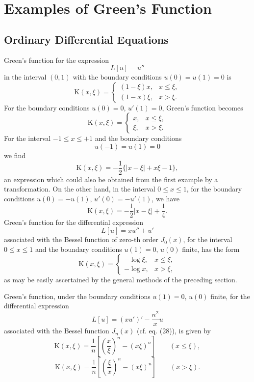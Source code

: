 \section{Examples of Green's Function}
\subsection{Ordinary Differential Equations}
Green's function for the expression
\[
L[u]=u''
\]
in the interval $(0,1)$ with the boundary conditions $u(0)=u(1)=0$ is
\[
\mathrm K(x,\xi)=
\begin{cases}
(1-\xi)x,&x\le\xi,\\
(1-x)\xi,&x>\xi.
\end{cases}
\]
For the boundary conditions $u(0)=0$, $u'(1)=0$, Green's function becomes
\[
\mathrm K(x,\xi)=
\begin{cases}
x,&x\le\xi,\\
\xi,&x>\xi.
\end{cases}
\]
For the interval $-1\le x\le+1$ and the boundary conditions
\[
u(-1)=u(1)=0
\]
we find
\[
\mathrm K(x,\xi)=-\frac12\{|x-\xi|+x\xi-1\},
\]
an expression which could also be obtained from the first example by a transformation. On the other hand, in the interval $0\le x\le1$, for the boundary conditions $u(0)=-u(1)$, $u'(0)=-u'(1)$, we have
\[
\mathrm K(x,\xi)=-\frac12|x-\xi|+\frac14.
\]
Green's function for the differential expression
\[
L[u]=xu''+u'
\]
associated with the Bessel function of zero-th order $J_0(x)$, for the interval $0\le x\le1$ and the boundary conditions $u(1)=0$, $u(0)$ finite, has the form
\[
\mathrm K(x,\xi)=
\begin{cases}
-\log\xi,&x\le\xi,\\
-\log x,&x>\xi,
\end{cases}
\]
as may be easily ascertained by the general methods of the preceding section.

Green's function, under the boundary conditions $u(1)=0$, $u(0)$ finite, for the differential expression
\[
L[u]=(xu')'-\frac{n^2}{x}u
\]
associated with the Bessel function $J_n(x)$ (cf. eq. (28)), is given by
\[
\mathrm K(x,\xi)=\frac1n\left[\left(\frac{x}{\xi}\right)^n-(x\xi)^n\right]\qquad(x\le\xi),
\]
\[
\mathrm K(x,\xi)=\frac1n\left[\left(\frac{\xi}{x}\right)^n-(x\xi)^n\right]\qquad(x>\xi).
\]

